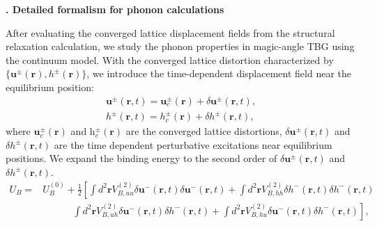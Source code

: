 \documentclass[aps,prx,10pt,twocolumn,superscriptaddress]{revtex4}
\def\IV{{\uppercase\expandafter{\romannumeral 4}}}
\begin{document}
\begin{widetext}
\vspace{12pt}
\begin{center}
\textbf{\large \IV.  Detailed formalism for  phonon calculations}
\end{center}

After evaluating the converged lattice displacement fields from the structural relaxation calculation, we study the phonon properties in magic-angle TBG using the continuum model. With the converged lattice distortion characterized by $\{\textbf{u}^{\pm}(\textbf{r}), h^{\pm}(\textbf{r})\}$, we introduce the time-dependent displacement field near the equilibrium position:
\begin{equation}
\begin{split}
\textbf{u}^{\pm}(\textbf{r},t)=\textbf{u}^{\pm}_{c}(\textbf{r})+\delta\textbf{u}^{\pm}(\textbf{r},t),\\
h^{\pm}(\textbf{r},t)=h^{\pm}_{c}(\textbf{r})+\delta h^{\pm}(\textbf{r},t),
\end{split}
\end{equation}
where $\textbf{u}^{\pm}_{c}(\textbf{r})$ and h$^{\pm}_{c}(\textbf{r})$ are the converged lattice distortions, $\delta\textbf{u}^{\pm}(\textbf{r},t)$ and $\delta h^{\pm}(\textbf{r},t)$ are the time dependent perturbative excitations near equilibrium positions. We expand the binding energy to the second order of $\delta\textbf{u}^{\pm}(\textbf{r},t)$ and  $\delta h^{\pm}(\textbf{r},t)$.
\begin{equation}
\begin{split}
U_{B}=&U^{(0)}_{B}+\frac{1}{2}\left[\int d^{2}\textbf{r} V^{(2)}_{B,uu}\delta\textbf{u}^{-}(\textbf{r},t)\delta\textbf{u}^{-}(\textbf{r},t) + \int d^{2}\textbf{r}V^{(2)}_{B,hh}\delta h^{-}(\textbf{r},t)\delta h^{-}(\textbf{r},t) \right. \\
&\ \ \ \ \ \ \ \ \ \ \ \ \ \ \left.\int d^{2}\textbf{r}V^{(2)}_{B,uh}\delta\textbf{u}^{-}(\textbf{r},t)\delta h^{-}(\textbf{r},t) +\int d^{2}\textbf{r}V^{(2)}_{B,hu}\delta\textbf{u}^{-}(\textbf{r},t)\delta h^{-}(\textbf{r},t)\right] , 

\end{split}
\end{equation}
\end{widetext}
\end{document}
